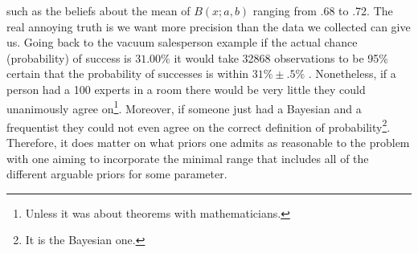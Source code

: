 \documentclass[12pt,letterpaper]{article}
\begin{document}
such as the beliefs about the mean of $B(x;a,b)$ ranging from .68 to .72.
The real annoying truth is we want more precision than the data we collected can give us.
Going back to the vacuum salesperson example if the actual chance (probability) of success is 
$31.00\%$ it would take 32868 observations to be 95\% certain that the probability of successes is within $31\% \pm .5\%$ .
Nonetheless, if a person had a 100 experts in a room there would be very little they could unanimously agree 
on\footnote{Unless it was about theorems with mathematicians.}. Moreover, if someone just had a Bayesian and a frequentist they could 
not even agree on the correct definition of probability\footnote{It is the Bayesian one.}.
Therefore, it does matter on what priors one admits as reasonable to the problem with one aiming to incorporate the minimal range that includes 
all of the different arguable priors for some parameter. 
\end{document}
